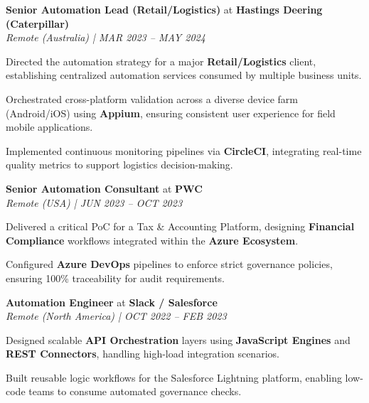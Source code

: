 \item \label{job:aurus}
\textbf{Senior Automation Lead (Retail/Logistics)} at \textbf{Hastings Deering (Caterpillar)} \\
\textit{Remote (Australia) | MAR 2023 – MAY 2024}
\resumeItemListStart
    \item Directed the automation strategy for a major \textbf{Retail/Logistics} client, establishing centralized automation services consumed by multiple business units.
    \item Orchestrated cross-platform validation across a diverse device farm (Android/iOS) using \textbf{Appium}, ensuring consistent user experience for field mobile applications.
    \item Implemented continuous monitoring pipelines via \textbf{CircleCI}, integrating real-time quality metrics to support logistics decision-making.
\resumeItemListEnd

\item \label{job:globant}
\textbf{Senior Automation Consultant} at \textbf{PWC} \\
\textit{Remote (USA) | JUN 2023 – OCT 2023}
\resumeItemListStart
    \item Delivered a critical PoC for a Tax \& Accounting Platform, designing \textbf{Financial Compliance} workflows integrated within the \textbf{Azure Ecosystem}.
    \item Configured \textbf{Azure DevOps} pipelines to enforce strict governance policies, ensuring 100\% traceability for audit requirements.
\resumeItemListEnd

\item \label{job:oktana}
\textbf{Automation Engineer} at \textbf{Slack / Salesforce} \\
\textit{Remote (North America) | OCT 2022 – FEB 2023}
\resumeItemListStart
    \item Designed scalable \textbf{API Orchestration} layers using \textbf{JavaScript Engines} and \textbf{REST Connectors}, handling high-load integration scenarios.
    \item Built reusable logic workflows for the Salesforce Lightning platform, enabling low-code teams to consume automated governance checks.
\resumeItemListEnd

